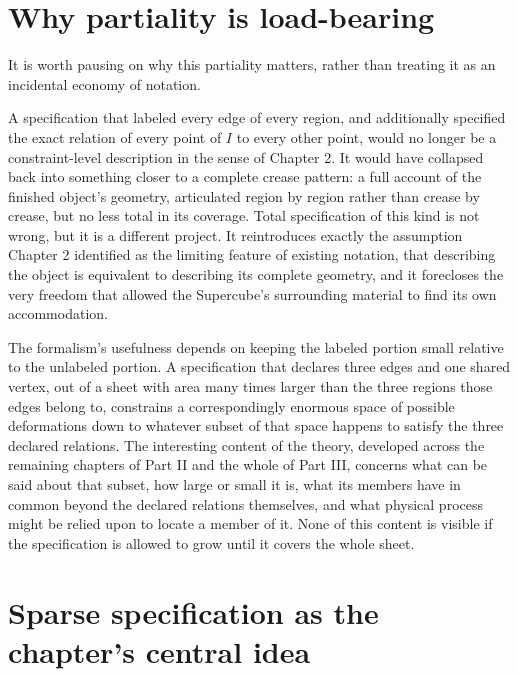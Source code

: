 \documentclass[11pt,oneside]{book}
\begin{document}
\hypertarget{why-partiality-is-load-bearing}{%
\section{Why partiality is
load-bearing}\label{why-partiality-is-load-bearing}}

It is worth pausing on why this partiality matters, rather than treating
it as an incidental economy of notation.

A specification that labeled every edge of every region, and
additionally specified the exact relation of every point of \(I\) to
every other point, would no longer be a constraint-level description in
the sense of Chapter 2. It would have collapsed back into something
closer to a complete crease pattern: a full account of the finished
object's geometry, articulated region by region rather than crease by
crease, but no less total in its coverage. Total specification of this
kind is not wrong, but it is a different project. It reintroduces
exactly the assumption Chapter 2 identified as the limiting feature of
existing notation, that describing the object is equivalent to
describing its complete geometry, and it forecloses the very freedom
that allowed the Supercube's surrounding material to find its own
accommodation.

The formalism's usefulness depends on keeping the labeled portion small
relative to the unlabeled portion. A specification that declares three
edges and one shared vertex, out of a sheet with area many times larger
than the three regions those edges belong to, constrains a
correspondingly enormous space of possible deformations down to whatever
subset of that space happens to satisfy the three declared relations.
The interesting content of the theory, developed across the remaining
chapters of Part II and the whole of Part III, concerns what can be said
about that subset, how large or small it is, what its members have in
common beyond the declared relations themselves, and what physical
process might be relied upon to locate a member of it. None of this
content is visible if the specification is allowed to grow until it
covers the whole sheet.

\hypertarget{sparse-specification-as-the-chapters-central-idea}{%
\section{Sparse specification as the chapter's central
idea}\label{sparse-specification-as-the-chapters-central-idea}}
\end{document}

